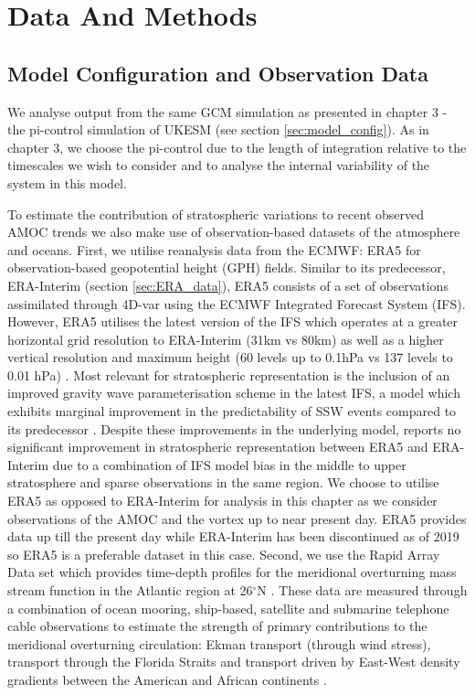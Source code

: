 \section{Data And Methods}
\subsection{Model Configuration and Observation Data}

We analyse output from the same GCM simulation as presented in chapter 3 - the pi-control simulation of UKESM (see section \ref{sec:model_config}). As in chapter 3, we choose the pi-control due to the length of integration relative to the timescales we wish to consider and to analyse the internal variability of the system in this model. 

To estimate the contribution of stratospheric variations to recent observed AMOC trends we also make use of observation-based datasets of the atmosphere and oceans. First, we utilise reanalysis data from the ECMWF: ERA5 \citep{hersbachERA52020c} for observation-based geopotential height (GPH) fields. Similar to its predecessor, ERA-Interim (section \ref{sec:ERA_data}), ERA5 consists of a set of observations assimilated through 4D-var using the ECMWF Integrated Forecast System (IFS). However, ERA5 utilises the latest version of the IFS which operates at a greater horizontal grid resolution to ERA-Interim (31km vs 80km) as well as a higher vertical resolution and maximum height (60 levels up to 0.1hPa vs 137 levels to 0.01 hPa) \citep{hersbachERA52020c}. Most relevant for stratospheric representation is the inclusion of an improved gravity wave parameterisation scheme in the latest IFS, a model which exhibits marginal improvement in the predictability of SSW events compared to its predecessor \citep{orrImproved2010a}. Despite these improvements in the underlying model, \cite{hersbachERA52020c} reports no significant improvement in stratospheric representation between ERA5 and ERA-Interim due to a combination of IFS model bias in the middle to upper stratosphere and sparse observations in the same region. We choose to utilise ERA5 as opposed to ERA-Interim for analysis in this chapter as we consider observations of the AMOC and the vortex up to near present day. ERA5 provides data up till the present day while ERA-Interim has been discontinued as of 2019 so ERA5 is a preferable dataset in this case. 
Second, we use the Rapid Array Data set which provides time-depth profiles for the meridional overturning mass stream function in the Atlantic region at 26$^{\circ}$N \citep{moatAtlantic2020c}. These data are measured through a combination of ocean mooring, ship-based, satellite and submarine telephone cable observations to estimate the strength of primary contributions to the meridional overturning circulation: Ekman transport (through wind stress), transport through the Florida Straits and transport driven by East-West density gradients between the American and African continents \citep{mccarthyMeasuring2015b}.

